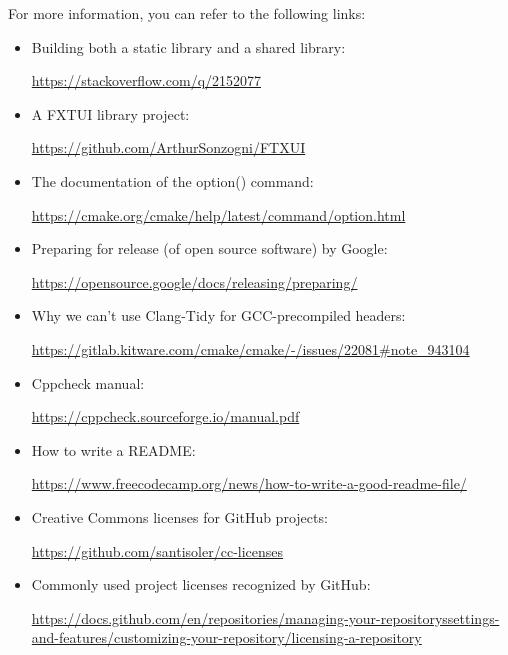 For more information, you can refer to the following links:

\begin{itemize}
\item
Building both a static library and a shared library:

\url{https://stackoverflow.com/q/2152077}

\item
A FXTUI library project:

\url{https://github.com/ArthurSonzogni/FTXUI}

\item
The documentation of the option() command:

\url{https://cmake.org/cmake/help/latest/command/option.html}

\item
Preparing for release (of open source software) by Google:

\url{https://opensource.google/docs/releasing/preparing/}

\item
Why we can’t use Clang-Tidy for GCC-precompiled headers:

\url{https://gitlab.kitware.com/cmake/cmake/-/issues/22081#note_943104}

\item
Cppcheck manual:

\url{https://cppcheck.sourceforge.io/manual.pdf}

\item
How to write a README:

\url{https://www.freecodecamp.org/news/how-to-write-a-good-readme-file/}

\item
Creative Commons licenses for GitHub projects:

\url{https://github.com/santisoler/cc-licenses}

\item
Commonly used project licenses recognized by GitHub:

\url{https://docs.github.com/en/repositories/managing-your-repositoryssettings-and-features/customizing-your-repository/licensing-a-repository}
\end{itemize}